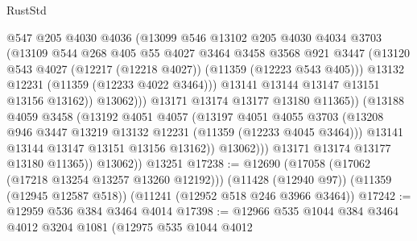 \begin{lexlean}{RustStd}
\begin{coremodule}
{{{{{{{{{{{{{{{{{{{                            @547
                            @205
                            @4030
                            @4036
                            (@13099
                              @546
                              @13102
                              @205
                              @4030
                              @4034
                              @3703
                              (@13109
                                @544
                                @268
                                @405
                                @55
                                @4027
                                @3464
                                @3458
                                @3568
                                @921
                                @3447
                                (@13120
                                  @543
                                  @4027
                                  (@12217 (@12218 @4027))
                                  (@11359 (@12223 @543 @405)))
                                @13132
                                @12231
                                (@11359 (@12233 @4022 @3464)))
                              @13141
                              @13144
                              @13147
                              @13151
                              @13156
                              @13162))
                          @13062)))
                    @13171
                    @13174
                    @13177
                    @13180
                    @11365))
                (@13188
                  @4059
                  @3458
                  (@13192
                    @4051
                    @4057
                    (@13197
                      @4051
                      @4055
                      @3703
                      (@13208 @946 @3447 @13219 @13132 @12231 (@11359 (@12233 @4045 @3464)))
                      @13141
                      @13144
                      @13147
                      @13151
                      @13156
                      @13162))
                  @13062)))
            @13171
            @13174
            @13177
            @13180
            @11365))
        @13062))
    @13251
@17238 := @12690
    (@17058 (@17062 (@17218 @13254 @13257 @13260 @12192)))
    (@11428 (@12940 @97))
    (@11359 (@12945 @12587 @518))
    (@11241 (@12952 @518 @246 @3966 @3464))
@17242 := @12959 @536 @384 @3464 @4014
@17398 := @12966
    @535
    @1044
    @384
    @3464
    @4012
    @3204
    @1081
    (@12975
      @535
      @1044
      @4012
}}}}}}}}}}}}}}}}}}}
\end{coremodule}
\end{lexlean}
